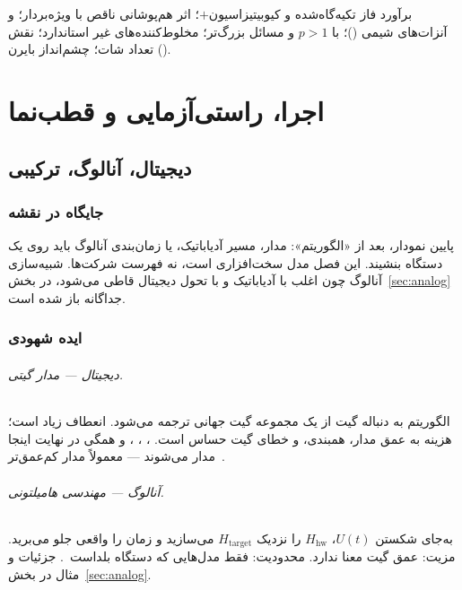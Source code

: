 \begin{remark}
برآورد فاز تکیه‌گاه‌شده و کیوبیتیزاسیون$+$؛ اثر هم‌پوشانی ناقص با ویژه‌بردار؛  و آنزات‌های شیمی ()؛  با $p>1$ و مسائل  بزرگ‌تر؛ مخلوط‌کننده‌های غیر استاندارد؛ نقش تعداد شات؛ چشم‌انداز بایرن ().
\end{remark}

\part{اجرا، راستی‌آزمایی و قطب‌نما}

\chapter{دیجیتال، آنالوگ، ترکیبی}
\label{chap:hardware}

\section{جایگاه در نقشه}

پایین نمودار، بعد از «الگوریتم»: مدار، مسیر آدیاباتیک، یا زمان‌بندی آنالوگ باید روی یک دستگاه بنشیند. این فصل مدل سخت‌افزاری است، نه فهرست شرکت‌ها. شبیه‌سازی آنالوگ چون اغلب با آدیاباتیک و با تحول دیجیتال قاطی می‌شود، در بخش~\ref{sec:analog} جداگانه باز شده است.

\section{ایده شهودی}

\paragraph{دیجیتال --- مدار گیتی.}
الگوریتم به دنباله گیت از یک مجموعه گیت جهانی ترجمه می‌شود. انعطاف زیاد است؛ هزینه به عمق مدار، همبندی، و خطای گیت حساس است. ، ، ،  و  همگی در نهایت اینجا مدار می‌شوند ---  معمولاً مدار کم‌عمق‌تر~\cite{Preskill2018}.

\paragraph{آنالوگ --- مهندسی هامیلتونی.}
به‌جای شکستن $U(t)$، $H_{\mathrm{hw}}$ را نزدیک $H_{\mathrm{target}}$ می‌سازید و زمان را واقعی جلو می‌برید. مزیت: عمق گیت معنا ندارد. محدودیت: فقط مدل‌هایی که دستگاه بلداست~\cite{CiracZoller2012,Georgescu2014}. جزئیات و مثال در بخش~\ref{sec:analog}.

